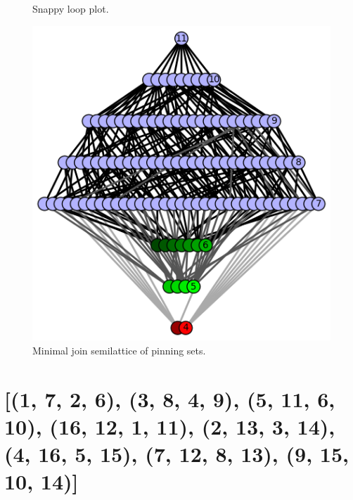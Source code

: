 \documentclass{article}%
\begin{document}
\begin{multicols}{2}
\begin{figure}[H]
\centering
\def\svgscale{0.7}

\caption{Snappy loop plot.}
\label{fig:tex/img/[(1, 7, 2, 6), (4, 9, 5, 10), (2, 12, 3, 11), (7, 13, 8, 12), (18, 13, 1, 14), (3, 17, 4, 16), (5, 14, 6, 15), (8, 18, 9, 17), (10, 15, 11, 16)].svg}
\end{figure}
\columnbreak

\begin{figure}[H]
\centering
\includegraphics[scale=.9]{tex/img/[(1, 7, 2, 6), (4, 9, 5, 10), (2, 12, 3, 11), (7, 13, 8, 12), (18, 13, 1, 14), (3, 17, 4, 16), (5, 14, 6, 15), (8, 18, 9, 17), (10, 15, 11, 16)].png}
\caption{Minimal join semilattice of pinning sets.}
\label{fig:tex/img/[(1, 7, 2, 6), (4, 9, 5, 10), (2, 12, 3, 11), (7, 13, 8, 12), (18, 13, 1, 14), (3, 17, 4, 16), (5, 14, 6, 15), (8, 18, 9, 17), (10, 15, 11, 16)].png}
\end{figure}
\end{multicols}

\newpage

\section{[(1, 7, 2, 6), (3, 8, 4, 9), (5, 11, 6, 10), (16, 12, 1, 11), (2, 13, 3, 14), (4, 16, 5, 15), (7, 12, 8, 13), (9, 15, 10, 14)]}
\end{document}
